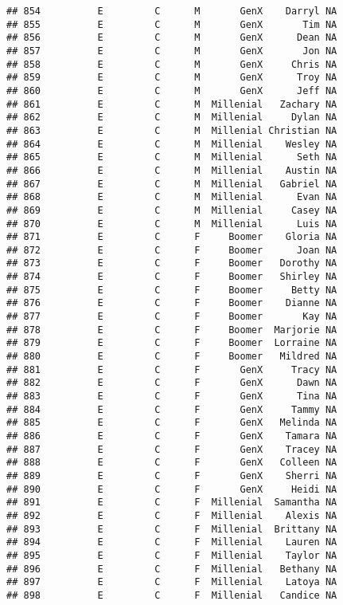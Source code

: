 \documentclass[
]{article}
\begin{document}
\begin{verbatim}
## 854          E         C      M       GenX    Darryl NA
## 855          E         C      M       GenX       Tim NA
## 856          E         C      M       GenX      Dean NA
## 857          E         C      M       GenX       Jon NA
## 858          E         C      M       GenX     Chris NA
## 859          E         C      M       GenX      Troy NA
## 860          E         C      M       GenX      Jeff NA
## 861          E         C      M  Millenial   Zachary NA
## 862          E         C      M  Millenial     Dylan NA
## 863          E         C      M  Millenial Christian NA
## 864          E         C      M  Millenial    Wesley NA
## 865          E         C      M  Millenial      Seth NA
## 866          E         C      M  Millenial    Austin NA
## 867          E         C      M  Millenial   Gabriel NA
## 868          E         C      M  Millenial      Evan NA
## 869          E         C      M  Millenial     Casey NA
## 870          E         C      M  Millenial      Luis NA
## 871          E         C      F     Boomer    Gloria NA
## 872          E         C      F     Boomer      Joan NA
## 873          E         C      F     Boomer   Dorothy NA
## 874          E         C      F     Boomer   Shirley NA
## 875          E         C      F     Boomer     Betty NA
## 876          E         C      F     Boomer    Dianne NA
## 877          E         C      F     Boomer       Kay NA
## 878          E         C      F     Boomer  Marjorie NA
## 879          E         C      F     Boomer  Lorraine NA
## 880          E         C      F     Boomer   Mildred NA
## 881          E         C      F       GenX     Tracy NA
## 882          E         C      F       GenX      Dawn NA
## 883          E         C      F       GenX      Tina NA
## 884          E         C      F       GenX     Tammy NA
## 885          E         C      F       GenX   Melinda NA
## 886          E         C      F       GenX    Tamara NA
## 887          E         C      F       GenX    Tracey NA
## 888          E         C      F       GenX   Colleen NA
## 889          E         C      F       GenX    Sherri NA
## 890          E         C      F       GenX     Heidi NA
## 891          E         C      F  Millenial  Samantha NA
## 892          E         C      F  Millenial    Alexis NA
## 893          E         C      F  Millenial  Brittany NA
## 894          E         C      F  Millenial    Lauren NA
## 895          E         C      F  Millenial    Taylor NA
## 896          E         C      F  Millenial   Bethany NA
## 897          E         C      F  Millenial    Latoya NA
## 898          E         C      F  Millenial   Candice NA

\end{verbatim}
\end{document}
